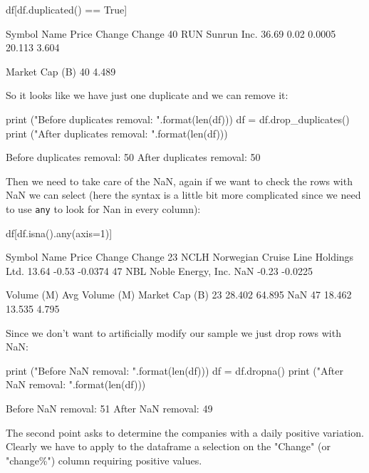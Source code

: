 \begin{ipython}
df[df.duplicated() == True]

   Symbol         Name  Price  Change  Change%
40    RUN  Sunrun Inc.  36.69    0.02   0.0005      20.113           3.604

    Market Cap (B)
40           4.489
\end{ipython}
        
So it looks like we have just one duplicate and we can remove it:

\begin{ipython}
print ("Before duplicates removal: {}".format(len(df)))
df = df.drop_duplicates()
print ("After duplicates removal: {}".format(len(df)))

Before duplicates removal: 50
After duplicates removal: 50
\end{ipython}

Then we need to take care of the NaN, again if we want to check the rows with NaN we can select (here the syntax is a little bit more complicated since we need to use \texttt{any} to look for Nan in every column):

\begin{ipython}
df[df.isna().any(axis=1)]

   Symbol                                 Name  Price  Change  Change%
23   NCLH  Norwegian Cruise Line Holdings Ltd.  13.64   -0.53  -0.0374
47    NBL                   Noble Energy, Inc.    NaN   -0.23  -0.0225

    Volume (M)  Avg Volume (M)  Market Cap (B)
23      28.402          64.895             NaN
47      18.462          13.535           4.795
\end{ipython}
        
Since we don't want to artificially modify our sample we just drop rows with NaN:

\begin{ipython}
print ("Before NaN removal: {}".format(len(df)))
df = df.dropna()
print ("After NaN removal: {}".format(len(df)))

Before NaN removal: 51
After NaN removal: 49
\end{ipython}

The second point asks to determine the companies with a daily positive variation. Clearly we have to apply to the dataframe a selection on the "Change" (or "change\%") column requiring positive values.

